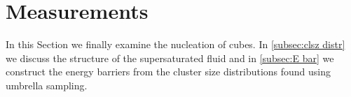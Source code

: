 \documentclass[thesis]{subfiles}
\begin{document}
\section{Measurements}

In this Section we finally examine the nucleation of cubes. In \ref{subsec:clsz distr} we discuss the structure of the supersaturated fluid and in \ref{subsec:E bar} we construct the energy barriers from the cluster size distributions found using umbrella sampling.

\begin{comment} %

\subsection{Equation of State}\label{subsec:eos}

One way to describe the properties of the system we study is by finding an \emph{equation of state}. By running multiple $NpT$ ensembles for differing pressures $p$, and finding the equilibrium density $\rho$ for each $p$, we can find the equation of state. This has been done before for both cubes and slanted cubes\cite{van2017phase}, and we will compare our results to previously done research to see if the simulation is working as intended.\\

For slant angles ranging from 90\degr\ (cubes) to 66\degr, two runs have been done per pressure: a compression run, starting at a relatively low density of 0.4 (i.e. in the fluid phase), and a melting run, starting in a relatively high density of 0.6 (i.e. in the crystal phase). Both runs start on a simple cubic lattice, but in the compression run this crystal melts immediately because of the low density. The results are shown in Figures \ref{fig:eos90}-\ref{fig:eos66}, where in each case on the left the equation of state on a larger range of pressures is shown, and on the right a more detailed look at the interesting region around the 

\begin{figure}[h]
	\begin{subfigure}[t]{0.475\textwidth}
		\texttt{[image: images/v21\_eos\_90all]}
		\caption{A plot of all data points.}
		\label{fig:eos90-a}
	\end{subfigure}\hfill
	\begin{subfigure}[t]{0.475\textwidth}
		\texttt{[image: images/v21\_eos\_90zoom]}
		\caption{A close-up of the interesting transition region.}
		\label{fig:eos90-b}
	\end{subfigure}
	\caption{The equation of state of hard cubes.}
	\label{fig:eos90}
\end{figure}


\end{comment}
\end{document}
